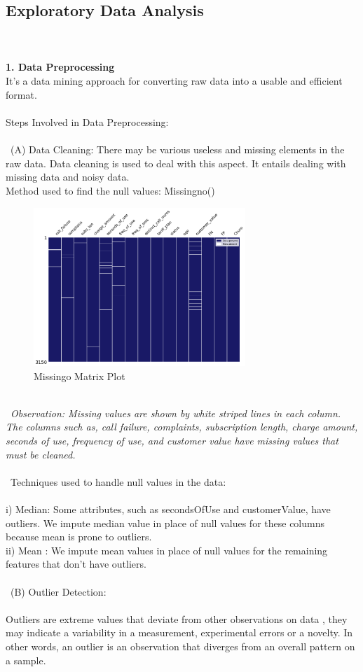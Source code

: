 \documentclass[a4paper, 10pt, conference]{ieeeconf}      %
\begin{document}
\subsection{\textbf{ Exploratory Data Analysis}}
\\\
\\\textbf{1. Data Preprocessing}
\\It's a data mining approach for converting raw data into a usable and efficient format.
\\\
\\
Steps Involved in Data Preprocessing: 
\\
\\\
(A) Data Cleaning: 
There may be various useless and missing elements in the raw data. Data cleaning is used to deal with this aspect. It entails dealing with missing data and noisy data.
\\ Method used to find the null values: Missingno()
\begin{figure}[htp]
    \centering
    \includegraphics[width=8cm,height=6cm]{Images/missing_Plot.png}
    \caption{Missingo Matrix Plot}
    \label{fig:MissingnoBarPlot}
\end{figure}
\\\
\textit{Observation: Missing values are shown by white striped lines in each column. The columns such as, call failure, complaints, subscription length, charge amount, seconds of use, frequency of use, and customer value have missing values that must be cleaned.}
\\\
\\\
Techniques used to handle null values in the data:
\\
\\i) Median: Some attributes, such as {secondsOfUse} and {customerValue}, have outliers. We impute median value in place of null values for these columns because mean is prone to outliers.
\\ii) Mean : We impute mean values in place of  null values for the remaining features that don't have outliers.
\\\
\\\
(B) Outlier Detection:
\\\
\\Outliers are extreme values that deviate from other observations on data , they may indicate a variability in a measurement, experimental errors or a novelty. In other words, an outlier is an observation that diverges from an overall pattern on a sample.
\end{document}
